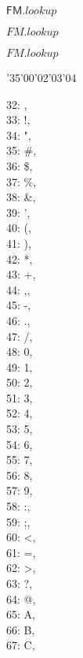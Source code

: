 \documentclass{article}
\begin{document}
$\mbox{}$

$\mathsf{FM}.\mathit{lookup}$

$\mathit{FM}.\mathit{lookup}$

$\mathit{FM.lookup}$

{\tentex\char'35\char'00\char'02\char'03\char'04}

{\tt\begin{tabbing}
32:  , \\
33: !, \\
34: ", \\
35: \#, \\
36: \$, \\
37: \%, \\
38: \&, \\
39: ', \\
40: (, \\
41: ), \\
42: *, \\
43: +, \\
44: ,, \\
45: -, \\
46: ., \\
47: /, \\
48: 0, \\
49: 1, \\
50: 2, \\
51: 3, \\
52: 4, \\
53: 5, \\
54: 6, \\
55: 7, \\
56: 8, \\
57: 9, \\
58: :, \\
59: ;, \\
60: <, \\
61: =, \\
62: >, \\
63: ?, \\
64: @, \\
65: A, \\
66: B, \\
67: C, \\

\end{tabbing}}
\end{document}
